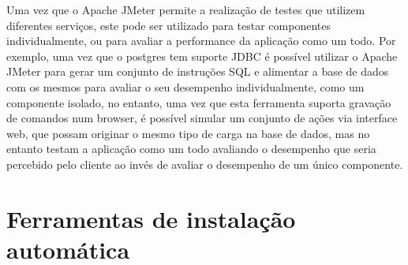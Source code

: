 \documentclass[12pt,a4paper]{article}
\begin{document}
Uma vez que o Apache JMeter permite a realização de testes que utilizem diferentes serviços, este pode ser utilizado para testar componentes individualmente, ou para avaliar a performance da aplicação como um todo. Por exemplo, uma vez que o postgres tem suporte JDBC é possível utilizar o Apache JMeter para gerar um conjunto de instruções SQL e alimentar a base de dados com os mesmos para avaliar o seu desempenho individualmente, como um componente isolado, no entanto, uma vez que esta ferramenta suporta gravação de comandos num browser, é possível simular um conjunto de ações via interface web, que possam originar o mesmo tipo de carga na base de dados, mas no entanto testam a aplicação como um todo avaliando o desempenho que seria percebido pelo cliente ao invés de avaliar o desempenho de um único componente.




\newpage
\section{Ferramentas de instalação automática}



\newpage
\end{document}
